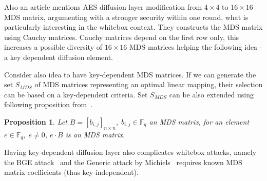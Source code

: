 \documentclass[11pt,oneside,final]{fithesis2}
\newtheorem{myprop}{Proposition}
\begin{document}
    Also an article \cite{mds_aes} mentions AES diffusion layer modification from $4 \times 4$ to $16 \times 16$ MDS matrix, argumenting with a
    stronger security within one round, what is particularly interesting in the whitebox context. They constructs the MDS matrix using Cauchy matrices. Cauchy matrices
    depend on the first row only, this increases a possible diversity of $16 \times 16$ MDS matrices helping the following idea - a key dependent diffusion element.

    \begin{figure}
    \begin{center}
    \leavevmode
    \centerline{}
    \end{center}
    \caption{}
    \label{fig:aes_mds}
    \end{figure}
    
    Consider also idea to have key-dependent MDS matrices. If we can generate the set $S_{MDS}$ of MDS matrices representing an optimal linear mapping, their selection 
    can be based on a key-dependent criteria. Set $S_{MDS}$ can be also extended using following proposition from~\citep{journals/iacr/MalikN11}.

    \begin{myprop}
	Let $B = \left[b_{i,j} \right]_{n \times n},\; b_{i,j} \in \mathbb{F}_q$ an MDS matrix, for an element $e \in \mathbb{F}_q, \; e \neq 0$, $e \cdot B$ is an MDS matrix.
    \end{myprop}
    
    Having key-dependent diffusion layer also complicates whitebox attacks, namely the BGE attack~\citep{Billet:2004:CWB:2080787.2080809} and 
    the Generic attack by Michiels~\citep{Michiels:2007:MST:1314276.1314291} requires known MDS matrix coefficients (thus key-independent).    
    
\end{document}
